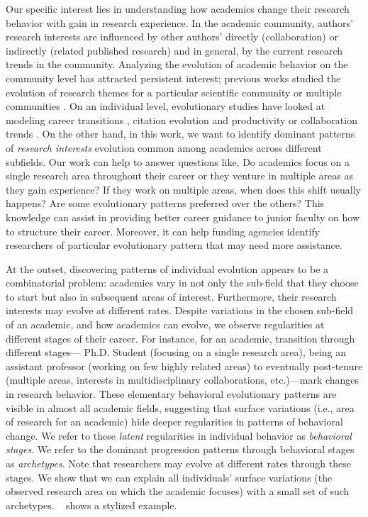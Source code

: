 Our specific interest lies in understanding how academics change their research behavior with gain in research experience. In the academic community, authors' research interests are influenced by other authors' directly (collaboration) or indirectly (related published research) and in general, by the current research trends in the community. Analyzing the evolution of academic behavior on the community level has attracted persistent interest; previous works studied the evolution of research themes for a particular scientific community \cite{Li:2011} or multiple communities \cite{Biryukov:2010, tanmoy:2013}.
On an individual level, evolutionary studies have looked at modeling career transitions \cite{Danai:2018}, citation evolution \cite{dashun:2013} and  productivity or collaboration trends \cite{Way:2017}. On the other hand, in this work, we want to identify dominant patterns of \emph{research interests} evolution common among academics across different subfields. Our work can help to answer questions like, Do academics focus on a single research area throughout their career or they venture in multiple areas as they gain experience? If they work on multiple areas, when does this shift usually happens? Are some evolutionary patterns preferred over the others? This knowledge can assist in providing better career guidance to junior faculty on how to structure their career. Moreover, it can help funding agencies identify researchers of particular evolutionary pattern that may need more assistance.


At the outset, discovering patterns of individual evolution appears to be a combinatorial problem: academics vary in not only the sub-field that they choose to start but also in subsequent areas of interest. Furthermore, their research interests may evolve at different rates. Despite variations in the chosen sub-field of an academic, and how academics can evolve, we observe regularities at different stages of their career. For instance, for an academic, transition through different stages--- Ph.D. Student (focusing on a single research area), being an assistant professor (working on few highly related areas) to eventually post-tenure (multiple areas, interests in multidisciplinary collaborations, etc.)---mark changes in research behavior. These elementary behavioral evolutionary patterns are visible in almost all academic fields, suggesting that surface variations (i.e., area of research for an academic) hide deeper regularities in patterns of behavioral change. We refer to these \textit{latent} regularities in individual behavior as \textit{behavioral stages}. We refer to the dominant progression patterns through behavioral stages as \textit{archetypes}. Note that researchers may evolve at different rates through these stages. We show that we can explain all individuals' surface variations (the observed research area on which the academic focuses) with a small set of such archetypes. ~ shows a stylized example.

